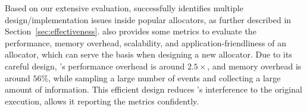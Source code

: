 

Based on our extensive evaluation, \MP{} successfully identifies multiple design/implementation issues inside popular allocators, as further described in Section~\ref{sec:effectiveness}. \MP{} also provides some metrics to evaluate the performance, memory overhead, scalability, and application-friendliness of an allocator, which can serve the basis when designing a new allocator. Due to its careful design, \MP{}'s performance overhead is around $2.5\times$, and memory overhead is around $56\%$, while sampling a large number of events and collecting a large amount of information. This efficient design reduces \MP{}'s interference to the original execution, allows it reporting the metrics confidently. 

